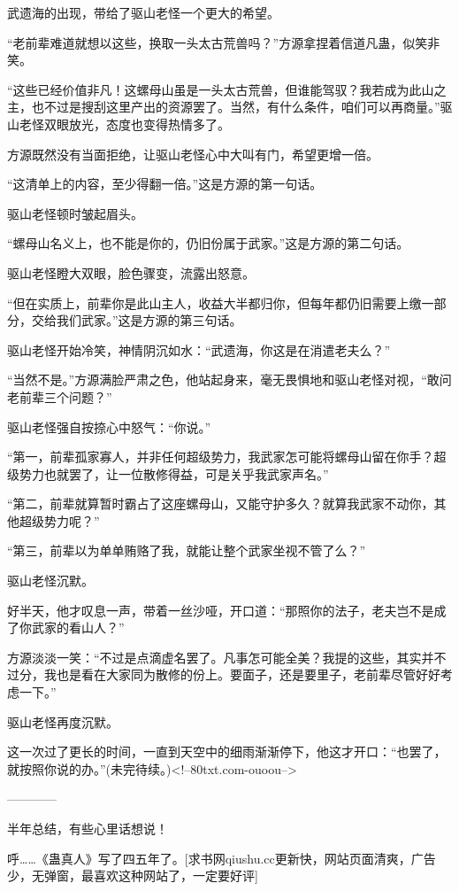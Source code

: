 \begin{this_body}
武遗海的出现，带给了驱山老怪一个更大的希望。

“老前辈难道就想以这些，换取一头太古荒兽吗？”方源拿捏着信道凡蛊，似笑非笑。

“这些已经价值非凡！这螺母山虽是一头太古荒兽，但谁能驾驭？我若成为此山之主，也不过是搜刮这里产出的资源罢了。当然，有什么条件，咱们可以再商量。”驱山老怪双眼放光，态度也变得热情多了。

方源既然没有当面拒绝，让驱山老怪心中大叫有门，希望更增一倍。

“这清单上的内容，至少得翻一倍。”这是方源的第一句话。

驱山老怪顿时皱起眉头。

“螺母山名义上，也不能是你的，仍旧份属于武家。”这是方源的第二句话。

驱山老怪瞪大双眼，脸色骤变，流露出怒意。

“但在实质上，前辈你是此山主人，收益大半都归你，但每年都仍旧需要上缴一部分，交给我们武家。”这是方源的第三句话。

驱山老怪开始冷笑，神情阴沉如水：“武遗海，你这是在消遣老夫么？”

“当然不是。”方源满脸严肃之色，他站起身来，毫无畏惧地和驱山老怪对视，“敢问老前辈三个问题？”

驱山老怪强自按捺心中怒气：“你说。”

“第一，前辈孤家寡人，并非任何超级势力，我武家怎可能将螺母山留在你手？超级势力也就罢了，让一位散修得益，可是关乎我武家声名。”

“第二，前辈就算暂时霸占了这座螺母山，又能守护多久？就算我武家不动你，其他超级势力呢？”

“第三，前辈以为单单贿赂了我，就能让整个武家坐视不管了么？”

驱山老怪沉默。

好半天，他才叹息一声，带着一丝沙哑，开口道：“那照你的法子，老夫岂不是成了你武家的看山人？”

方源淡淡一笑：“不过是点滴虚名罢了。凡事怎可能全美？我提的这些，其实并不过分，我也是看在大家同为散修的份上。要面子，还是要里子，老前辈尽管好好考虑一下。”

驱山老怪再度沉默。

这一次过了更长的时间，一直到天空中的细雨渐渐停下，他这才开口：“也罢了，就按照你说的办。”(未完待续。)<!--80txt.com-ouoou-->

------------

半年总结，有些心里话想说！

呼……《蛊真人》写了四五年了。[求书网qiushu.cc更新快，网站页面清爽，广告少，无弹窗，最喜欢这种网站了，一定要好评]


\end{this_body}
